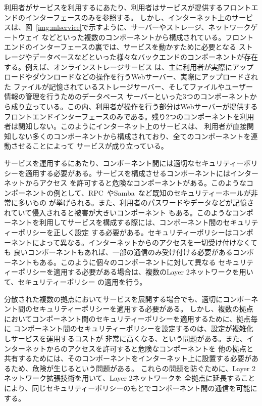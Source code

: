 
利用者がサービスを利用するにあたり、利用者はサービスが提供するフロントエンドのインターフェースのみを参照する。
しかし、インターネット上のサービスは、図~\ref{img:mlservice}で示すように、サーバーやストレージ、ネットワークゲートウェイ
などといった複数のコンポーネントから構成されている。フロントエンドのインターフェースの裏では、サービスを動かすために必要となる
ストレージやデータベースなどといった様々なバックエンドのコンポーネントが存在する。例えば、オンラインストレージサービス
は、主に利用者が実際にアップロードやダウンロードなどの操作を行うWebサーバー、実際にアップロードされた
ファイルが記憶されているストレージサーバー、そしてファイルやユーザー情報の管理を行うためのデータベース
サーバーといった3つのコンポーネントから成り立っている。この内、利用者が操作を行う部分はWebサーバーが提供する
フロントエンドインターフェースのみである。残り2つのコンポーネントを利用者は関知しない。このようにインターネット上のサービスは、
利用者が直接関知しない多くのコンポーネントから構成されており、全てのコンポーネントを連動させることによって
サービスが成り立っている。

サービスを運用するにあたり、コンポーネント間には適切なセキュリティーポリシーを適用する必要がある。サービスを構成させるコンポーネントにはインターネットからアクセス
を許可すると危険なコンポーネントがある。このようなコンポーネントの例として、RPC~\cite{rfc:rpc}やSamba~\cite{id:cifs}など既知のセキュリティーホールが非常に多いもの
が挙げられる。また、利用者のパスワードやデータなどが記憶されていて侵入されると被害が大きいコンポーネント
もある。このようなコンポーネントを利用してサービスを構成する際には、コンポーネント間のセキュリティーポリシーを正しく設定
する必要がある。セキュリティーポリシーはコンポーネントによって異なる。インターネットからのアクセスを一切受け付けなくても
良いコンポーネントもあれば、一部の通信のみ受け付ける必要があるコンポーネントもある。このように個々のコンポーネントに対して異なる
セキュリティーポリシーを適用する必要がある場合は、複数のLayer 2ネットワークを用いて、セキュリティーポリシー
の適用を行う。

分散された複数の拠点においてサービスを展開する場合でも、適切にコンポーネント間のセキュリティーポリシーを適用する必要がある。
しかし、複数の拠点においてコンポーネント間のセキュリティーポリシーを適用するために、拠点毎に
コンポーネント間のセキュリティーポリシーを設定するのは、設定が複雑化しサービスを運用するコストが
非常に高くなる、という問題がある。また、インターネットからのアクセスを許可すると危険なコンポーネントを
他の拠点と共有するためには、そのコンポーネントをインターネット上に設置する必要があるため、危険が生じるという問題がある。
これらの問題を防ぐために、Layer 2ネットワーク拡張技術を用いて、Layer 2ネットワークを
全拠点に延長することにより、同じセキュリティーポリシーのもとでコンポーネント間の通信を可能にする。

